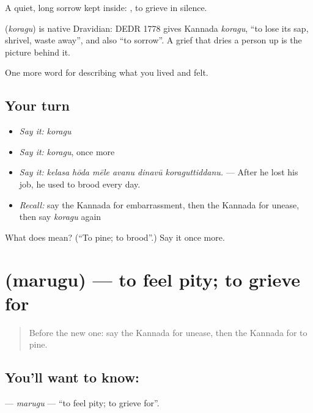 A quiet, long sorrow kept inside:  , to grieve in silence.

\begin{cousinweb}
\textbf{} (\emph{koragu}) is native Dravidian: DEDR 1778 gives Kannada \emph{koragu}, \textquotedblleft{}to lose its sap, shrivel, waste away\textquotedblright{}, and also \textquotedblleft{}to sorrow\textquotedblright{}. A grief that dries a person up is the picture behind it.
\end{cousinweb}

\begin{grammarlens}[title={What you've built}]
One more word for describing what you lived and felt.
\end{grammarlens}

\subsection*{Your turn}
\begin{itemize}
\raggedright
  \item \emph{Say it:} \emph{koragu}
  \item \emph{Say it:} \emph{koragu}, once more
  \item \emph{Say it:} \emph{kelasa hōda mēle avanu dinavū koraguttiddanu.} — After he lost his job, he used to brood every day.
  \item \emph{Recall:} say the Kannada for embarrassment, then the Kannada for unease, then say \emph{koragu} again
\end{itemize}

\begin{tcolorbox}[breakable,colback=teal!4,colframe=teal!35!black,title={Before you move on}]
What does  mean? (\textquotedblleft{}To pine; to brood\textquotedblright{}.) Say it once more.
\end{tcolorbox}
\section[\texorpdfstring{\kn{ಮರುಗು} (marugu)}{ಮರುಗು (marugu)}]{ (marugu) — to feel pity; to grieve for}

\label{lesson:KA-C491-marugu}



\begin{quote}
Before the new one: say the Kannada for unease, then the Kannada for to pine.
\end{quote}

\subsection*{You'll want to know: }
\textbf{} — \emph{marugu} — \textquotedblleft{}to feel pity; to grieve for\textquotedblright{}.

